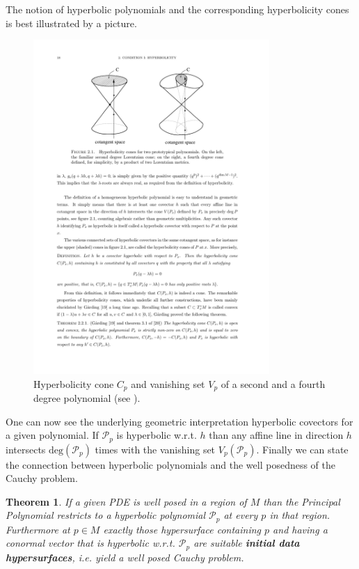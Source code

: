 \documentclass[a4paper,12pt, DIV=14, BCOR=5mm, twoside, headsepline, numbers=noenddot]{scrbook}
\newtheorem{theorem}{Theorem}[section]
\begin{document}
The notion of hyperbolic polynomials and the corresponding hyperbolicity cones is best illustrated by a picture. 
\begin{figure}[hbt!]
    \centering
    \includegraphics[width=0.8\textwidth]{Poly.pdf}
    \caption{Hyperbolicity cone $C_p$ and vanishing set $V_p$ of a second and a fourth degree polynomial (see \cite{Rivera}).}
    \label{hyperbol}
\end{figure}
One can now see the underlying geometric interpretation hyperbolic covectors for a given polynomial. If $\mathcal{P}_p$ is hyperbolic w.r.t. $h$ than any affine line in direction $h$ intersects $\mathrm{deg}(\mathcal{P}_p)$ times with the vanishing set $V_p(\mathcal{P}_p)$.
Finally we can state the connection between hyperbolic polynomials and the well posedness of the Cauchy problem.
\begin{theorem}
If a given PDE is well posed in a region of $M$ than the Principal Polynomial restricts to a hyperbolic polynomial $\mathcal{P}_p$ at every $p$ in that region. Furthermore at $p \in M$ exactly those hypersurface containing $p$ and having a conormal vector that is hyperbolic w.r.t. $\mathcal{P}_p$ are suitable \textit{\textbf{initial data hypersurfaces}}, i.e. yield a well posed Cauchy problem.
\end{theorem}
\end{document}
